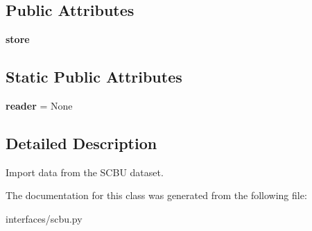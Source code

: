 \subsection*{Public Attributes}
\begin{DoxyCompactItemize}
\item 
\hypertarget{classinterfaces_1_1scbu_1_1_s_c_b_u___importer_af44236e3ec523c91419ffa313387270c}{{\bfseries store}}\label{classinterfaces_1_1scbu_1_1_s_c_b_u___importer_af44236e3ec523c91419ffa313387270c}

\end{DoxyCompactItemize}
\subsection*{Static Public Attributes}
\begin{DoxyCompactItemize}
\item 
\hypertarget{classinterfaces_1_1scbu_1_1_s_c_b_u___importer_a7b3c9ec1b884cde729ec0d82801b846b}{{\bfseries reader} = None}\label{classinterfaces_1_1scbu_1_1_s_c_b_u___importer_a7b3c9ec1b884cde729ec0d82801b846b}

\end{DoxyCompactItemize}


\subsection{Detailed Description}
Import data from the S\-C\-B\-U dataset. 

The documentation for this class was generated from the following file\-:\begin{DoxyCompactItemize}
\item 
interfaces/scbu.\-py\end{DoxyCompactItemize}
